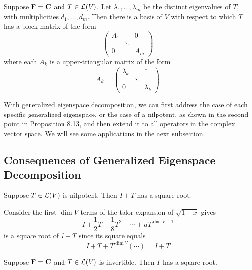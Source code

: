 \documentclass[12pt,a4paper]{article}
\begin{document}
    \begin{prop}
        Suppose $\mathbf{F}=\mathbf{C}$ and $T\in\mathcal{L}(V)$. Let $\lambda_1,\dots,\lambda_m$ be the distinct eigenvalues of $T$, with multiplicities $d_1,\dots,d_m$. Then there is a basis of $V$ with respect to which $T$ has a block matrix of the form
        $$
        \begin{pmatrix}
            A_1 & & 0\\
             &\ddots& \\
             0 & & A_m
        \end{pmatrix}
        $$
        where each $A_k$ is a  upper-triangular matrix of the form
        $$
        A_k=\begin{pmatrix}
            \lambda_k & & *\\
             &\ddots& \\
             0 & & \lambda_k
            \end{pmatrix}
        $$
    \end{prop}
    \hfill

    \begin{remark}
        With generalized eigenspace decomposition, we can first address the case of each specific generalized eigenspace, or the case of a nilpotent, as shown in the second point in \hyperref[8.13]{Proposition 8.13}, and then extend it to all operators in the complex vector space. We will see some applications in the next subsection.
    \end{remark}
    \hfill

    \subsection{Consequences of Generalized Eigenspace Decomposition}
    \begin{prop}
        Suppose $T\in\mathcal{L}(V)$ is nilpotent. Then $I+T$ has a square root.
    \end{prop}
    \begin{remark}
        Consider the first $\dim V$ terms of the talor expansion of $\sqrt{1+x}$ gives 
        $$
        I+\frac{1}{2}T-\frac{1}{8}T^2+\cdots+aT^{\dim V-1}
        $$
        is a square root of $I+T$ since its square equals
        $$
        I+T+T^{\dim V}(\cdots)=I+T
        $$
    \end{remark}
    \begin{prop}
        Suppose $\mathbf{F}=\mathbf{C}$ and $T\in\mathcal{L}(V)$ is invertible. Then $T$ has a square root.   
    \end{prop}
    \hfill
\end{document}
